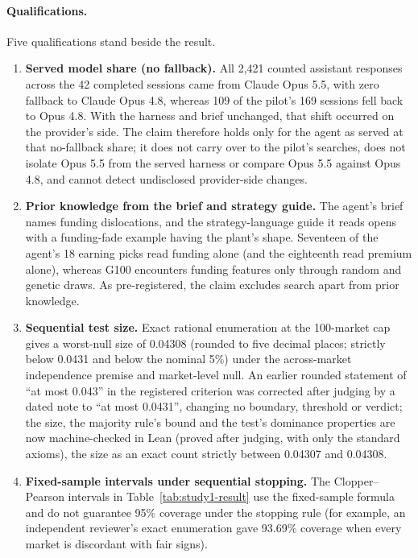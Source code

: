 \documentclass[11pt]{article}
\begin{document}
\paragraph{Qualifications.} Five qualifications stand beside the result.
\begin{enumerate}
  \item \textbf{Served model share (no fallback).} All 2{,}421 counted assistant responses across the 42 completed sessions came from Claude Opus 5.5, with zero fallback to Claude Opus 4.8, whereas 109 of the pilot's 169 sessions fell back to Opus 4.8. With the harness and brief unchanged, that shift occurred on the provider's side. The claim therefore holds only for the agent as served at that no-fallback share; it does not carry over to the pilot's searches, does not isolate Opus 5.5 from the served harness or compare Opus 5.5 against Opus 4.8, and cannot detect undisclosed provider-side changes.
  \item \textbf{Prior knowledge from the brief and strategy guide.} The agent's brief names funding dislocations, and the strategy-language guide it reads opens with a funding-fade example having the plant's shape. Seventeen of the agent's 18 earning picks read funding alone (and the eighteenth read premium alone), whereas G100 encounters funding features only through random and genetic draws. As pre-registered, the claim excludes search apart from prior knowledge.
  \item \textbf{Sequential test size.} Exact rational enumeration at the 100-market cap gives a worst-null size of 0.04308 (rounded to five decimal places; strictly below 0.0431 and below the nominal 5\%) under the across-market independence premise and market-level null. An earlier rounded statement of ``at most 0.043'' in the registered criterion was corrected after judging by a dated note to ``at most 0.0431'', changing no boundary, threshold or verdict; the size, the majority rule's bound and the test's dominance properties are now machine-checked in Lean (proved after judging, with only the standard axioms), the size as an exact count strictly between 0.04307 and 0.04308.
  \item \textbf{Fixed-sample intervals under sequential stopping.} The Clopper--Pearson intervals in Table~\ref{tab:study1-result} use the fixed-sample formula and do not guarantee 95\% coverage under the stopping rule (for example, an independent reviewer's exact enumeration gave 93.69\% coverage when every market is discordant with fair signs).

\end{enumerate}
\end{document}
